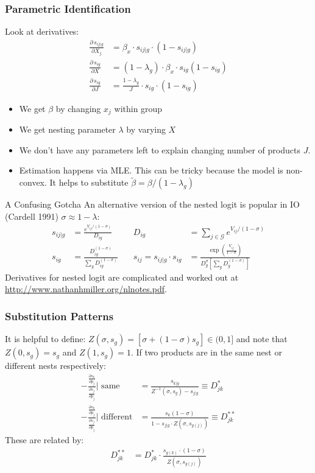 \documentclass[xcolor=pdftex,dvipsnames,table,mathserif,aspectratio=169]{beamer}
\begin{document}
\begin{frame}
\frametitle{Parametric Identification}
Look at derivatives:
\begin{align*}
\frac{\partial\, s_{ij|g}}{\partial X_j} &= \beta_x \cdot s_{ij|g} \cdot (1-s_{ij|g}) \\
 \frac{\partial\, s_{ig}}{\partial X} &= (1-\lambda_g) \cdot \beta_x \cdot s_{ig}(1-s_{ig}) \\
  \frac{\partial\, s_{ig}}{\partial J} &= \frac{1-\lambda_g}{J} \cdot s_{ig} \cdot (1-s_{ig})
\end{align*}
\begin{itemize}
\item We get $\beta$ by changing $x_j$ within group
\item We get nesting parameter $\lambda$ by varying $X$
\item We don't have any parameters left to explain changing number of products $J$.
\item Estimation happens via MLE. This can be tricky because the model is non-convex. It helps to substitute $\tilde{\beta} = \beta/(1-\lambda_g)$
\end{itemize}
\end{frame}

\begin{frame}{A Confusing Gotcha}
An alternative version of the nested logit is popular in IO (Cardell 1991) $\sigma \approx 1-\lambda$:
\begin{align*}
s_{ij | g}&=\frac{e^{V_{ij}/(1-\sigma)}}{D_{ig}}  \quad &
D_{ig}&= \sum_{j \in \mathcal{G}} e^{V_{ij}/(1-\sigma)}   \\
s_{ig}&=\frac{D_{ig}^{(1-\sigma)}}{\sum_{g} D_{ig}^{(1-\sigma)}} \quad &
s_{ij}=  s_{ij | g}\cdot s_{ig } &=\frac{\exp \left(\frac{V_{ij}}{1-\sigma}\right)}{D_{g}^{\sigma}\left[\sum_{g} D_{g}^{(1-\sigma)}\right]}
\end{align*}
Derivatives for nested logit are complicated and worked out at \url{http://www.nathanhmiller.org/nlnotes.pdf}.
\end{frame}

\begin{frame}
\frametitle{Substitution Patterns}
It is helpful to define: $Z(\sigma,s_g)=[\sigma + (1-\sigma) s_g ] \in (0,1]$ and note that $Z(0,s_g)=s_g$ and $Z(1,s_g)=1$. If two products are in the same nest or different nests respectively:
\begin{align*}
 -\frac{\frac{\partial s_{k}}{\partial p_j}}{\frac{\partial s_{j}}{\partial p_j} } \text{| same}
&=\frac{ s_{k|g} }{ Z^{-1}(\sigma,s_g) - s_{j|g}}  \equiv D_{jk}^{*}\\
 -\frac{\frac{\partial s_{k}}{\partial p_j}}{\frac{\partial s_{j}}{\partial p_j} } \text{| different}
&= \frac{ s_{k}  (1-\sigma) }{ 1 - s_{j|g} \cdot Z(\sigma,s_{g(j)}) } \equiv D_{jk}^{**}
\end{align*}
These are related by:
\begin{align*}
D_{jk}^{**}&=  D_{jk}^{*} \cdot \frac{s_{g(k)} \cdot (1-\sigma)}{Z(\sigma,s_{g(j)})}
\end{align*}
\end{frame}
\end{document}
